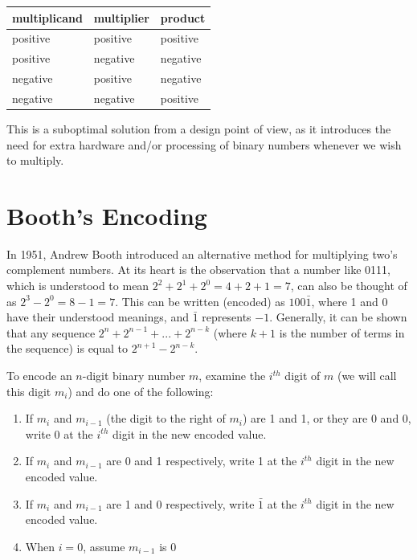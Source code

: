 \documentclass{article}
\begin{document}
\begin{center}
    \begin{tabular}{| l | l | l |}
        \hline
        multiplicand & multiplier & product \\
        \hline
        positive & positive & positive \\
        positive & negative & negative \\
        negative & positive & negative \\
        negative & negative & positive \\
        \hline
    \end{tabular}
\end{center}

This is a suboptimal solution from a design point of view, as it introduces the need for extra hardware and/or processing of binary numbers whenever we wish to multiply.

\section{Booth's Encoding}
In 1951, Andrew Booth introduced an alternative method for multiplying two's complement numbers.
At its heart is the observation that a number like 0111, which is understood to mean $2^2 + 2^1 + 2^0 = 4 + 2 + 1 = 7$, can also be thought of as $2^3 - 2^0 = 8 - 1 = 7$.
This can be written (encoded) as $100\bar{1}$, where 1 and 0 have their understood meanings, and $\bar{1}$ represents $-1$.
Generally, it can be shown that any sequence $2^n + 2^{n-1} + ... + 2^{n-k}$ (where $k+1$ is the number of terms in the sequence) is equal to $2^{n+1} - 2^{n-k}$.

To encode an $n$-digit binary number $m$, examine the $i^{th}$ digit of $m$ (we will call this digit $m_i$) and do one of the following: %

\begin{enumerate}
\item If $m_i$ and $m_{i-1}$ (the digit to the right of $m_i$) are 1 and 1, or they are 0 and 0, write 0 at the $i^{th}$ digit in the new encoded value.
\item If $m_i$ and $m_{i-1}$ are 0 and 1 respectively, write 1 at the $i^{th}$ digit in the new encoded value.
\item If $m_i$ and $m_{i-1}$ are 1 and 0 respectively, write $\bar{1}$ at the $i^{th}$ digit in the new encoded value.
\item When $i = 0$, assume $m_{i-1}$ is 0
\end{enumerate}
\end{document}
